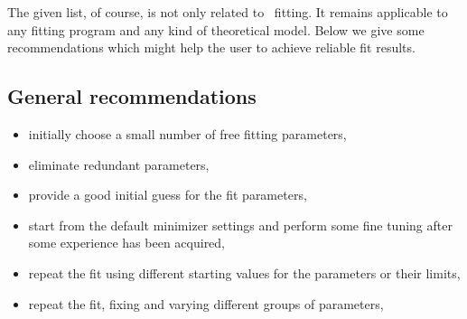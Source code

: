 The given list, of course, is not only related to \BornAgain\
fitting. It remains applicable to any fitting program and any kind of theoretical model.
 Below we give some recommendations which might help the user to achieve reliable fit results.

\subsection*{General recommendations}
\begin{itemize}
\item initially choose  a small number of free fitting parameters,
\item eliminate redundant parameters,
\item provide a good initial guess for the fit parameters,
\item start from the default minimizer settings and perform some fine tuning after some experience has been acquired,
\item repeat the fit using different starting values for the parameters or their limits,
\item repeat the fit, fixing and varying different groups of parameters,
\end{itemize}



